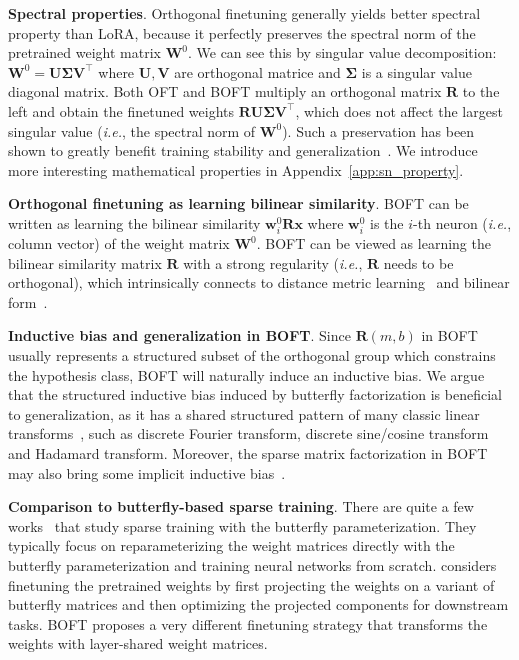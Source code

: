 \textbf{Spectral properties}. Orthogonal finetuning generally yields better spectral property than LoRA, because it perfectly preserves the spectral norm of the pretrained weight matrix $\bm{W}^0$. We can see this by singular value decomposition: $\bm{W}^0=\bm{U}\bm{\Sigma}\bm{V}^\top$ where $\bm{U},\bm{V}$ are orthogonal matrice and $\bm{\Sigma}$ is a singular value diagonal matrix. Both OFT and BOFT multiply an orthogonal matrix $\bm{R}$ to the left and obtain the finetuned weights $\bm{R}\bm{U}\bm{\Sigma}\bm{V}^\top$, which does not affect the largest singular value (\emph{i.e.}, the spectral norm of $\bm{W}^0$). Such a preservation has been shown to greatly benefit training stability and generalization~\cite{miyato2018spectral,yoshida2017spectral}. We introduce more interesting mathematical properties in Appendix~\ref{app:sn_property}.

\textbf{Orthogonal finetuning as learning bilinear similarity}. BOFT can be written as learning the bilinear similarity $\bm{w}^0_i\bm{R}\bm{x}$ where $\bm{w}^0_i$ is the $i$-th neuron (\emph{i.e.}, column vector) of the weight matrix $\bm{W}^0$. BOFT can be viewed as learning the bilinear similarity matrix $\bm{R}$ with a strong regularity (\emph{i.e.}, $\bm{R}$ needs to be orthogonal), which intrinsically connects to distance metric learning~\cite{xing2002distance} and bilinear form~\cite{roman2005advanced}.

\textbf{Inductive bias and generalization in BOFT}. Since $\bm{R}(m,b)$ in BOFT usually represents a structured subset of the orthogonal group which constrains the hypothesis class, BOFT will naturally induce an inductive bias. We argue that the structured inductive bias induced by butterfly factorization is beneficial to generalization, as it has a shared structured pattern of many classic linear transforms~\cite{dao2019kaleidoscope}, such as discrete Fourier transform, discrete sine/cosine transform and Hadamard transform. Moreover, the sparse matrix factorization in BOFT may also bring some implicit inductive bias~\cite{gunasekar2017implicit,li2018algorithmic,liu2019neural}.

\textbf{Comparison to butterfly-based sparse training}. There are quite a few works~\cite{dao2019learning,dao2019kaleidoscope,chen2022pixelated,dao2022monarch} that study sparse training with the butterfly parameterization. They typically focus on reparameterizing the weight matrices directly with the butterfly parameterization and training neural networks from scratch. \cite{dao2022monarch} considers finetuning the pretrained weights by first projecting the weights on a variant of butterfly matrices and then optimizing the projected components for downstream tasks. BOFT proposes a very different finetuning strategy that transforms the weights with layer-shared weight matrices.

